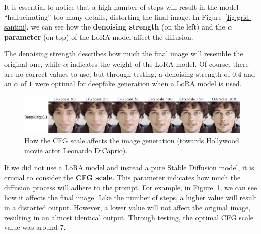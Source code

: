 \documentclass[preprint]{elsarticle}
\begin{document}
It is essential to notice that a high number of steps will result in the model ``hallucinating'' too many details, distorting the final image. In Figure~\ref{fig:grid-santini}, we can see how the \textbf{denoising strength} (on the left) and the \textbf{$\alpha$ parameter} (on top) of the LoRA model affect the diffusion. 

The denoising strength describes how much the final image will resemble the original one, while $\alpha$ indicates the weight of the LoRA model. Of course, there are no correct values to use, but through testing, a denoising strength of $0.4$ and an $\alpha$ of $1$ were optimal for deepfake generation when a LoRA model is used. 

\begin{figure}[t]
	\centering
	\includegraphics[width=\textwidth, keepaspectratio]{img/project_img/cfg-examples.png}
	\caption{How the CFG scale affects the image generation (towards Hollywood movie actor Leonardo DiCaprio).}
	\label{fig:cfg-examples}
\end{figure}

If we did not use a LoRA model and instead a pure Stable Diffusion model, 
it is crucial to consider the \textbf{CFG scale}. 
This parameter indicates how much the diffusion process will adhere to the prompt.  For example, in Figure~\ref{fig:cfg-examples}, we can see how it affects the final image.  Like the number of steps, a higher value will result in a distorted output. However, a lower value will not affect the original image, resulting in an almost identical output. Through testing, the optimal CFG scale value was around $7$.
\end{document}
